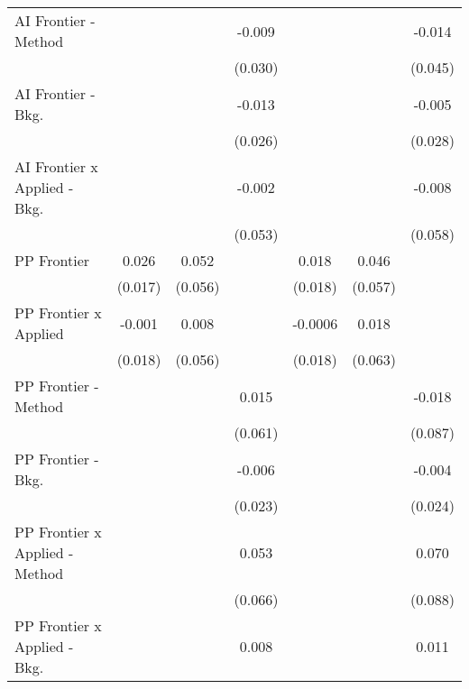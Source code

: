 \begin{tabular}{lcccccc}
   AI Frontier - Method           &         &                & -0.009  &              &               & -0.014\\   
                                  &         &                & (0.030) &              &               & (0.045)\\   
   AI Frontier - Bkg.             &         &                & -0.013  &              &               & -0.005\\   
                                  &         &                & (0.026) &              &               & (0.028)\\   
   AI Frontier x Applied - Bkg.   &         &                & -0.002  &              &               & -0.008\\   
                                  &         &                & (0.053) &              &               & (0.058)\\   
   PP Frontier                    & 0.026   & 0.052          &         & 0.018        & 0.046         &   \\   
                                  & (0.017) & (0.056)        &         & (0.018)      & (0.057)       &   \\   
   PP Frontier x Applied          & -0.001  & 0.008          &         & -0.0006      & 0.018         &   \\   
                                  & (0.018) & (0.056)        &         & (0.018)      & (0.063)       &   \\   
   PP Frontier - Method           &         &                & 0.015   &              &               & -0.018\\   
                                  &         &                & (0.061) &              &               & (0.087)\\   
   PP Frontier - Bkg.             &         &                & -0.006  &              &               & -0.004\\   
                                  &         &                & (0.023) &              &               & (0.024)\\   
   PP Frontier x Applied - Method &         &                & 0.053   &              &               & 0.070\\   
                                  &         &                & (0.066) &              &               & (0.088)\\   
   PP Frontier x Applied - Bkg.   &         &                & 0.008   &              &               & 0.011\\   

\end{tabular}
